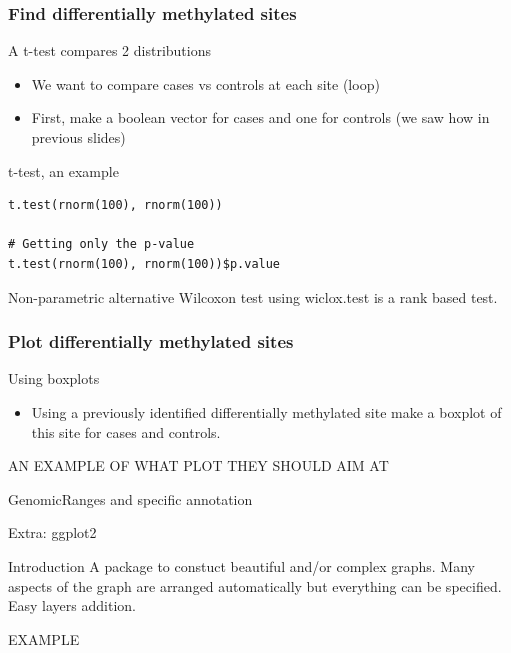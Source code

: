 \documentclass[10pt]{beamer}
\newenvironment{xframe}[2][]
  {\begin{frame}[fragile,environment=xframe,#1]
  \frametitle{#2}}
  {\end{frame}}
\begin{document}

\begin{xframe}{Find differentially methylated sites}
  \begin{block}{A t-test compares 2 distributions}
    \begin{itemize}
      \item We want to compare {\sf cases} vs {\sf controls} at each site
      (loop)
      \item First, make a boolean vector for cases and one for controls (we saw
      how in previous slides)
    \end{itemize}
      \end{block}
    \begin{exampleblock}{t-test, an example}
\begin{verbatim}
t.test(rnorm(100), rnorm(100))

# Getting only the p-value
t.test(rnorm(100), rnorm(100))$p.value

\end{verbatim}  
  \end{exampleblock}   
    \begin{alertblock}{Non-parametric alternative}
      Wilcoxon test using {\sf wiclox.test} is a rank based test.
    \end{alertblock}
\end{xframe}


\begin{xframe}{Plot differentially methylated sites}
  \begin{block}{Using boxplots}
    \begin{itemize}
      \item Using a previously identified differentially methylated site make a
      boxplot of this site for {\sf cases} and {\sf controls}.
    \end{itemize}
  \end{block}
  
  AN EXAMPLE OF WHAT PLOT THEY SHOULD AIM AT
  
\end{xframe}



\begin{frame}{GenomicRanges and specific annotation}
  
\end{frame}


\begin{frame}{Extra: {\sf ggplot2}}
  \begin{block}{Introduction}
    A package to constuct beautiful and/or complex graphs. Many aspects of the graph are arranged automatically but everything can be specified. Easy layers addition.
  \end{block}
  
  EXAMPLE

\end{frame}
\end{document}
